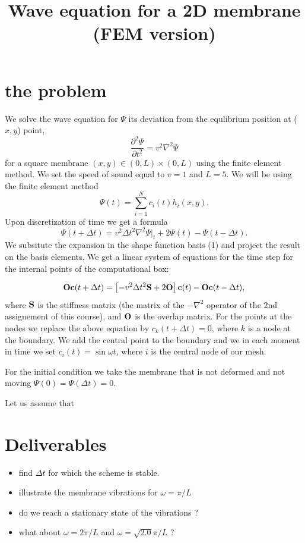 \documentclass[7pt]{article}
\title{Wave equation for a 2D membrane (FEM version)}
\begin{document}
\maketitle




\section{the problem}


We solve the wave equation for $\Psi$ its deviation from the equlibrium position at ($x,y$) point,
\begin{equation} \frac{\partial^2 \Psi}{\partial t^2}=v^2\nabla^2\Psi \end{equation}
for a square membrane $(x,y)\in(0,L)\times(0,L)$ using the finite element method. We set the speed of sound equal to $v=1$ and $L=5$.
We will be using the finite element method
 \begin{equation} \Psi(t)=\sum_{i=1}^N c_i(t) h_i(x,y).\end{equation} 
Upon discretization of time we get a formula \begin{equation}\Psi(t+\Delta t)=v^2\Delta t^2 \nabla ^2 \Psi |_t+2\Psi(t)-\Psi(t-\Delta t).\end{equation}
We subsitute the expansion in the shape function basis (1) and project the result on the basis elements. We get a linear system of equations for
the time step for the internal points of the computational box:

\begin{equation}
{\bf O}{\bf c}(t+\Delta t)=\left[-v^2\Delta t^2 {\bf S}+2 {\bf O}\right]{\bf c}(t)-{\bf Oc}(t-\Delta t),
\end{equation}
where ${\bf S}$ is the stiffness matrix (the matrix of the $-\nabla^2$ operator of the 2nd assignement of this course),
and ${\bf O}$ is the overlap matrix.
For the points at the nodes we replace the above equation by $c_k(t+\Delta t)=0$, where $k$ is a node at the boundary.
We add the central point to the boundary and we in each moment in time we set $c_i(t)=\sin\omega t$, where $i$
is the central node of our mesh. 

For the initial condition we take the membrane that is not deformed and not moving $\Psi(0)=\Psi(\Delta t)=0$.





Let us assume that 

\section{Deliverables}
\begin{itemize}
\item find $\Delta t$ for which the scheme is stable.
\item illustrate the membrane vibrations for $\omega=\pi/L$
\item do we reach a stationary state of the vibrations ?
\item what about $\omega=2\pi/L$ and $\omega=\sqrt{2.0}\pi/L$ ?

\end{itemize}
\end{document}
